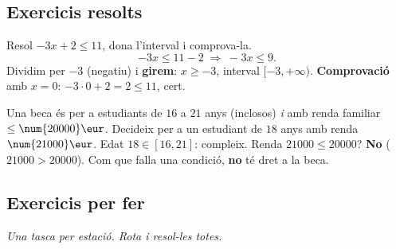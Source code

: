 \subsection{Exercicis resolts}

\begin{exresolt}
Resol $-3x+2\le 11$, dona l'interval i comprova-la.
\solucio
\[
-3x\le 11-2 \;\Rightarrow\; -3x\le 9.
\]
Dividim per $-3$ (negatiu) i \textbf{girem}: $x\ge -3$, interval $[-3,+\infty)$.
\textbf{Comprovació} amb $x=0$: $-3\cdot 0+2=2\le 11$, cert.
\resposta{$x\ge -3$, interval $[-3,+\infty)$.}
\end{exresolt}

\begin{exresolt}
Una beca és per a estudiants de $16$ a $21$ anys (inclosos) \emph{i} amb renda
familiar $\le\num{20000}\eur$. Decideix per a un estudiant de $18$ anys amb renda
$\num{21000}\eur$.
\solucio
Edat $18\in[16,21]$: compleix. Renda $\num{21000}\le\num{20000}$? \textbf{No}
($\num{21000}>\num{20000}$). Com que falla una condició, \textbf{no} té dret a la beca.
\end{exresolt}

\subsection{Exercicis per fer}

\noindent\textit{Una tasca per estació. Rota i resol-les totes.}

